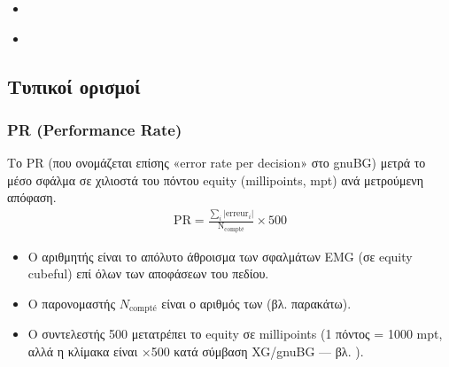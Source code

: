 \documentclass[letterpaper,10pt,greek]{sphinxmanual}
\begin{document}
\begin{sphinxcontents}
\begin{itemize}
\begin{itemize}
\item {} 
\sphinxAtStartPar
{}\label{\detokenize{stats_parity:id11}}{\hyperref[\detokenize{stats_parity:comparaison-gnubg-blunderdb-import-sgf-moteurs-differents}]{}}

\end{itemize}

\item {} 
\sphinxAtStartPar
{}\label{\detokenize{stats_parity:id12}}{\hyperref[\detokenize{stats_parity:valider-vos-propres-chiffres}]{}}

\item {} 
\sphinxAtStartPar
{}\label{\detokenize{stats_parity:id13}}{\hyperref[\detokenize{stats_parity:reference-gnubg}]{}}

\end{itemize}
\end{sphinxcontents}


\subsection{Τυπικοί ορισμοί}
\label{\detokenize{stats_parity:definitions-formelles}}

\subsubsection{PR (Performance Rate)}
\label{\detokenize{stats_parity:pr-performance-rate}}
\sphinxAtStartPar
Το PR (που ονομάζεται επίσης «error rate per decision» στο gnuBG) μετρά το μέσο σφάλμα σε χιλιοστά του πόντου equity (millipoints, mpt) ανά μετρούμενη απόφαση.
\begin{equation*}
\begin{split}\mathrm{PR} = \frac{\sum_i |\mathrm{erreur}_i|}{\mathrm{N_{compté}}} \times 500\end{split}
\end{equation*}\begin{itemize}
\item {} 
\sphinxAtStartPar
Ο αριθμητής είναι το απόλυτο άθροισμα των σφαλμάτων EMG (σε equity cubeful) επί όλων των αποφάσεων του πεδίου.

\item {} 
\sphinxAtStartPar
Ο παρονομαστής \(N_\text{compté}\) είναι ο αριθμός των  (βλ. παρακάτω).

\item {} 
\sphinxAtStartPar
Ο συντελεστής 500 μετατρέπει το equity σε millipoints (1 πόντος = 1000 mpt, αλλά η κλίμακα είναι ×500 κατά σύμβαση XG/gnuBG — βλ. ).

\end{itemize}
\end{document}
